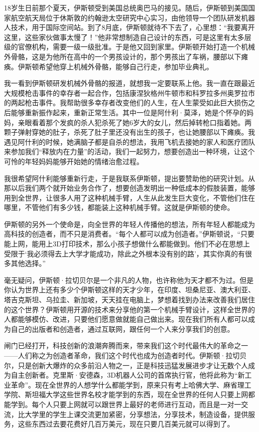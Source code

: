 18岁生日前那个夏天，伊斯顿受到美国总统奥巴马的接见。随后，伊斯顿到美国国家航空航天局位于休斯敦的约翰逊太空研究中心实习，由他领导一个团队研发机器人技术，用于国际空间站。到了8月底，伊斯顿就待不下去了，心里想：“我要离开这里，这些家伙做事太慢了！”他非常想制造自己设计的东西，可是这里有太多层级的官僚机构，需要一级一级批准。于是他又回到家里。伊斯顿开始打造一个机械外骨骼，这是为他所在高中的一个男孩设计的，那个男孩出了车祸，腰部以下瘫痪。伊斯顿希望他穿上机械外骨骼，能够自己行走，参加毕业典礼。

我一看到伊斯顿研发机械外骨骼的报道，就想我一定要联系上他。我一直在跟最近大规模枪击事件的幸存者一起合作，包括康涅狄格州牛顿市和科罗拉多州奥罗拉市的两起枪击事件。我帮助很多幸存者改变他们的人生，在人生蒙受如此巨大损伤之后能够重新振作起来，重新正常生活。其中一位是阿什利·莫泽，她是个怀孕的妈妈，亲眼看着那个发疯的杀人犯杀死了她6岁大的女儿，然后掉转枪口指着她。两颗子弹射穿她的肚子，杀死了肚子里还没有出生的孩子，也让她腰部以下瘫痪。我遇见阿什利的时候，她满脑子都是自杀的想法，我用飞机去接她的家人和医疗团队来参加我们“释放内在力量”的活动，我们一起努力，想要创造出一种环境，让这个可怜的年轻妈妈能够开始她的情绪治愈过程。

我很希望阿什利能够重新行走，于是我联系伊斯顿，提出要赞助他的研究计划。从那以后我们两个就开始业务合作了，想要创造发明出一种低成本的假肢装置，能够用到全世界，让很多人用了这种机械手臂，人生从此发生巨大变化，不管他们住在哪里，不管他们有多少钱，都能装上这种机械手臂。这就是伊斯顿的使命。

伊斯顿的另外一个使命是，向全世界的年轻人传播他的想法，所有年轻人都能成为高科技的创造者，而不只是消费者。“每个人都可以成为创造者。”伊斯顿说，“只要能上网，能用上3D打印技术，那么小孩子想做什么都能做到。他们不必在思想上受限于‘我必须得去上大学才能成功，除此之外根本没有别的路’，其实你真的有很多其他选择。”

毫无疑问，伊斯顿·拉切贝尔是一个非凡的人物，也许称他为天才都不为过。但是你认为世界上还有多少个伊斯顿这样的天才少年，在印度、坦桑尼亚、澳大利亚、塔吉克斯坦、乌拉圭、新加坡，天天挂在电脑上，梦想着找到办法来改善我们居住的这个世界？伊斯顿用开源的技术来分享他的第一个机械手臂设计，这样全世界的人都能够模仿、改进，只要他们愿意做就能自己做出来。现在我们所有人都可以成为自己的出版者和创造者，通过互联网，跟任何一个人来分享我们的创意。

闸门已经打开，科技创新的浪潮奔腾而来，带来我们这个时代最伟大的革命之一——人们称之为创造者革命，我们这个时代也成为创造者时代。伊斯顿·拉切贝尔，只是创新大爆炸的众多前沿人物之一，正是科技迅猛发展进步才让无数个人成为自主创新者。克里斯·安德森，3D机器人公司的首席执行官，他将此称为“新工业革命”。现在全世界的人想学什么都能学到，原来只有考上哈佛大学、麻省理工学院、斯坦福大学这些世界名校才能学到的东西，现在全世界的任何人只要上网都能学到。每个人只要上网就可以跟世界上最好的老师进行互动，而且是一对一交流，比大学里的学生上课交流更加紧密，分享想法，分享技术，制造设备，提供服务，这些东西过去要花费好几百万美元，现在只要几百美元就可以得到了。

